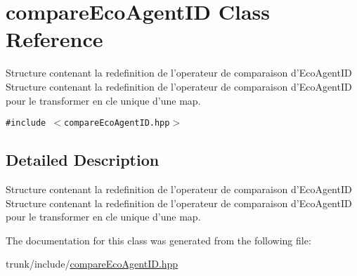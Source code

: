 \hypertarget{structcompareEcoAgentID}{
\section{compareEcoAgentID Class Reference}
\label{structcompareEcoAgentID}
}
Structure contenant la redefinition de l'operateur de comparaison d'EcoAgentID Structure contenant la redefinition de l'operateur de comparaison d'EcoAgentID pour le transformer en cle unique d'une map.  


{\tt \#include $<$compareEcoAgentID.hpp$>$}



\subsection{Detailed Description}
Structure contenant la redefinition de l'operateur de comparaison d'EcoAgentID Structure contenant la redefinition de l'operateur de comparaison d'EcoAgentID pour le transformer en cle unique d'une map. 

The documentation for this class was generated from the following file:\begin{CompactItemize}
\item 
trunk/include/\hyperlink{compareEcoAgentID_8hpp}{compareEcoAgentID.hpp}\end{CompactItemize}
